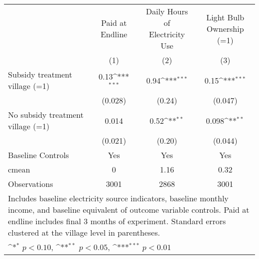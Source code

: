 \def\sym#1{\ifmmode^{#1}\else\(^{#1}\)\fi}
\begin{adjustbox}{max
width={\textwidth},caption={Endline payment, electricity, and bulb outcomes},nofloat=table}
\begin{tabular}{l*{3}{c}}
\toprule
&\shortstack{Paid at\\Endline} & \shortstack{Daily Hours of\\Electricity Use} & \shortstack{Light Bulb\\Ownership (=1)} \\
& (1) & (2) & (3) \\ \hline
Subsidy treatment village (=1)&     0.13\sym{***}&     0.94\sym{***}&     0.15\sym{***}\\
                &  (0.028)         &   (0.24)         &  (0.047)         \\
No subsidy treatment village (=1)&    0.014         &     0.52\sym{**} &    0.098\sym{**} \\
                &  (0.021)         &   (0.20)         &  (0.044)         \\
Baseline Controls &      Yes         &      Yes         &      Yes         \\
\midrule
cmean           &        0         &     1.16         &     0.32         \\
Observations    &     3001         &     2868         &     3001         \\
\bottomrule
\multicolumn{4}{p{\textwidth}}{\footnotesize Includes baseline electricity source indicators, baseline monthly income, and baseline equivalent of outcome variable controls. Paid at endline includes final 3 months of experiment. Standard errors clustered at the village level in parentheses.}\\
\multicolumn{4}{p{\textwidth}}{\footnotesize \sym{*} \(p<0.10\), \sym{**} \(p<0.05\), \sym{***} \(p<0.01\)}\\
\end{tabular}\end{adjustbox}
